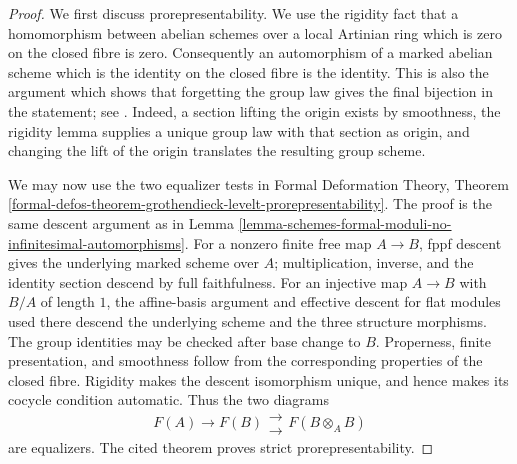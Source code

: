 \begin{proof}
We first discuss prorepresentability. We use the rigidity fact that a
homomorphism between abelian schemes over a local Artinian ring which is zero
on the closed fibre is zero. Consequently an automorphism of a marked abelian
scheme which is the identity on the closed fibre is the identity. This is also
the argument which shows that forgetting the group law gives the final
bijection in the statement; see
\cite[Proposition 2.2.6]{Oort-local-moduli}. Indeed, a section lifting the
origin exists by smoothness, the rigidity lemma supplies a unique group law
with that section as origin, and changing the lift of the origin translates
the resulting group scheme.

We may now use the two equalizer tests in Formal Deformation Theory, Theorem
\ref{formal-defos-theorem-grothendieck-levelt-prorepresentability}. The proof
is the same descent argument as in Lemma
\ref{lemma-schemes-formal-moduli-no-infinitesimal-automorphisms}. For a
nonzero finite free map $A \to B$, fppf descent gives the underlying marked
scheme over $A$; multiplication, inverse, and the identity section descend by
full faithfulness. For an injective map $A \to B$ with $B/A$ of length $1$,
the affine-basis argument and effective descent for flat modules used there
descend the underlying scheme and the three structure morphisms. The group
identities may be checked after base change to $B$. Properness, finite
presentation, and smoothness follow from the corresponding properties of the
closed fibre. Rigidity makes the descent isomorphism unique, and hence makes
its cocycle condition automatic. Thus the two diagrams
$$
F(A) \longrightarrow F(B)
\mathrel{\substack{\longrightarrow \\[-0.6ex] \longrightarrow}}
F(B \otimes_A B)
$$
are equalizers. The cited theorem proves strict prorepresentability.


\end{proof}

